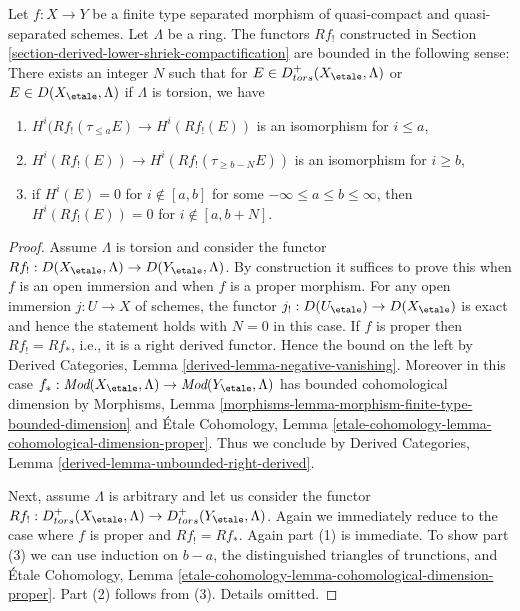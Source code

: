 \begin{lemma}
\label{lemma-derived-lower-shriek-bounded}
Let $f : X \to Y$ be a finite type separated morphism of quasi-compact
and quasi-separated schemes. Let $\Lambda$ be a ring. The functors $Rf_!$
constructed in Section \ref{section-derived-lower-shriek-compactification}
are bounded in the following sense: There exists an integer $N$ such that
for $E \in D^+_{tors}(X_\etale, \Lambda)$ or $E \in D(X_\etale, \Lambda)$
if $\Lambda$ is torsion, we have
\begin{enumerate}
\item $H^i(Rf_!(\tau_{\leq a}E) \to H^i(Rf_!(E))$ is an isomorphism
for $i \leq a$,
\item $H^i(Rf_!(E)) \to H^i(Rf_!(\tau_{\geq b - N}E))$ is an isomorphism
for $i \geq b$,
\item if $H^i(E) = 0$ for $i \not \in [a, b]$ for some
$-\infty \leq a \leq b \leq \infty$, then $H^i(Rf_!(E)) = 0$
for $i \not \in [a, b + N]$.
\end{enumerate}
\end{lemma}

\begin{proof}
Assume $\Lambda$ is torsion and consider the functor
$Rf_! : D(X_\etale, \Lambda) \to D(Y_\etale, \Lambda)$.
By construction it suffices to prove this when $f$ is an open immersion
and when $f$ is a proper morphism. For any open immersion $j : U \to X$
of schemes, the functor $j_! : D(U_\etale) \to D(X_\etale)$ is exact
and hence the statement holds with $N = 0$ in this case.
If $f$ is proper then $Rf_! = Rf_*$, i.e., it is a right derived
functor. Hence the bound on the left by
Derived Categories, Lemma \ref{derived-lemma-negative-vanishing}.
Moreover in this case $f_* : \textit{Mod}(X_\etale, \Lambda)
\to \textit{Mod}(Y_\etale, \Lambda)$ has bounded cohomological dimension by
Morphisms, Lemma \ref{morphisms-lemma-morphism-finite-type-bounded-dimension}
and \'Etale Cohomology, Lemma
\ref{etale-cohomology-lemma-cohomological-dimension-proper}.
Thus we conclude by
Derived Categories, Lemma \ref{derived-lemma-unbounded-right-derived}.

\medskip\noindent
Next, assume $\Lambda$ is arbitrary and let us consider the functor
$Rf_! : D^+_{tors}(X_\etale, \Lambda) \to D^+_{tors}(Y_\etale, \Lambda)$.
Again we immediately reduce to the case where $f$ is proper and
$Rf_! = Rf_*$. Again part (1) is immediate. To show part (3)
we can use induction on $b - a$, the distinguished
triangles of trunctions, and \'Etale Cohomology, Lemma
\ref{etale-cohomology-lemma-cohomological-dimension-proper}.
Part (2) follows from (3). Details omitted.
\end{proof}

